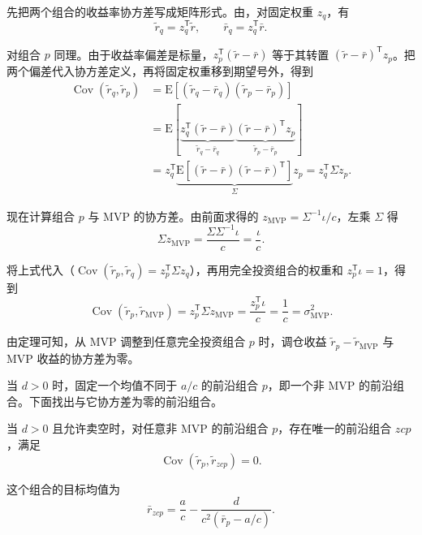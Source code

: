 \begin{solution}[label-content={证明二（由 MVP 权重求解）},blank-type=none]
先把两个组合的收益率协方差写成矩阵形式。由，对固定权重 $z_q$，有
\[
 \widetilde r_q=z_q^{\mathsf T}\widetilde r,\qquad
 \bar r_q=z_q^{\mathsf T}\bar r.
\]

对组合 $p$ 同理。由于收益率偏差是标量，$z_p^{\mathsf T}(\widetilde r-\bar r)$ 等于其转置 $(\widetilde r-\bar r)^{\mathsf T}z_p$。把两个偏差代入协方差定义，再将固定权重移到期望号外，得到
\begin{equation*}
 \begin{aligned}
 \operatorname{Cov}(\widetilde r_q,\widetilde r_p)
 &=\mathrm E\!\left[(\widetilde r_q-\bar r_q)(\widetilde r_p-\bar r_p)\right]\\
 &=\mathrm E\!\left[
 \underbrace{z_q^{\mathsf T}(\widetilde r-\bar r)}_{\widetilde r_q-\bar r_q}
 \underbrace{(\widetilde r-\bar r)^{\mathsf T}z_p}_{\widetilde r_p-\bar r_p}
 \right]\\
 &=z_q^{\mathsf T}
 \underbrace{\mathrm E\!\left[(\widetilde r-\bar r)(\widetilde r-\bar r)^{\mathsf T}\right]}_{\Sigma}
 z_p
 =z_q^{\mathsf T}\Sigma z_p.
 \end{aligned}
 \tag{12.VIII}\label{eq:wj-12-portfolio-covariance}
\end{equation*}

现在计算组合 $p$ 与 MVP 的协方差。由前面求得的 $z_{\mathrm{MVP}}=\Sigma^{-1}\iota/c$，左乘 $\Sigma$ 得
\[
 \Sigma z_{\mathrm{MVP}}
 =\frac{\Sigma\Sigma^{-1}\iota}{c}
 =\frac{\iota}{c}.
\]

将上式代入（$\operatorname{Cov}(\widetilde r_p,\widetilde r_q)=z_p^{\mathsf T}\Sigma z_q$），再用完全投资组合的权重和 $z_p^{\mathsf T}\iota=1$，得到
\[
 \operatorname{Cov}(\widetilde r_p,\widetilde r_{\mathrm{MVP}})
 =z_p^{\mathsf T}\Sigma z_{\mathrm{MVP}}
 =\frac{z_p^{\mathsf T}\iota}{c}=\frac1c=\sigma_{\mathrm{MVP}}^2.
\]
\end{solution}

由定理可知，从 MVP 调整到任意完全投资组合 $p$ 时，调仓收益 $\widetilde r_p-\widetilde r_{\mathrm{MVP}}$ 与 MVP 收益的协方差为零。

当 $d>0$ 时，固定一个均值不同于 $a/c$ 的前沿组合 $p$，即一个非 MVP 的前沿组合。下面找出与它协方差为零的前沿组合。

\begin{tcolorbox}[knowledge]
 当 $d>0$ 且允许卖空时，对任意非 MVP 的前沿组合 $p$，存在唯一的前沿组合 $zcp$，满足
\[
 \operatorname{Cov}(\widetilde r_p,\widetilde r_{zcp})=0.
\]

这个组合的目标均值为
\begin{equation*}
 \bar r_{zcp}=\frac ac-\frac{d}{c^2(\bar r_p-a/c)}.
 \tag{12.IX}\label{eq:wj-12-zero-covariance-mean}
\end{equation*}
\end{tcolorbox}

